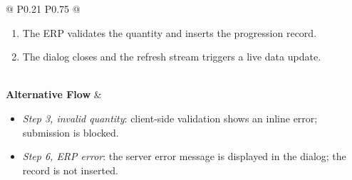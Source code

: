 \begin{longtable}{@{} P{0.21\linewidth} P{0.75\linewidth} @{}}
\begin{enumerate}[noitemsep, topsep=0pt, partopsep=0pt, leftmargin=*]
	\item The ERP validates the quantity and inserts the progression record.
	\item The dialog closes and the refresh stream triggers a live data update.
	\end{enumerate} \\
	\midrule
	\textbf{Alternative Flow} & 
	\begin{itemize}[noitemsep, topsep=0pt, partopsep=0pt, leftmargin=*]
	\item \textit{Step 3, invalid quantity}: client-side validation shows an inline error; submission is blocked.
	\item \textit{Step 6, ERP error}: the server error message is displayed in the dialog; the record is not inserted.
	\end{itemize} \\
\end{longtable}


\bigskip


